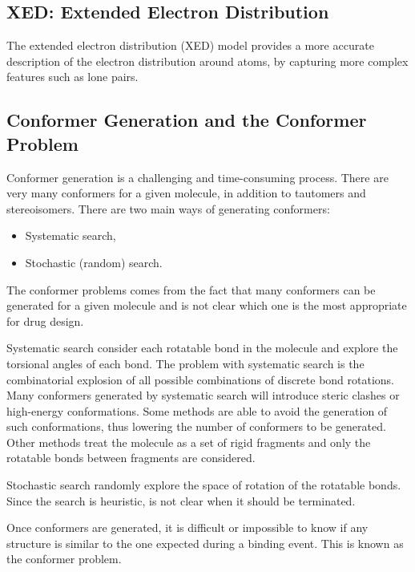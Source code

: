 \subsection{XED: Extended Electron Distribution}

The extended electron distribution (XED) model provides a more accurate description of the electron distribution around atoms, by capturing more complex features such as lone pairs.


\subsection{Conformer Generation and the Conformer Problem}

Conformer generation is a challenging and time-consuming process. 
There are very many conformers for a given molecule, in addition to tautomers and stereoisomers.
There are two main ways of generating conformers:
\begin{itemize}
    \item Systematic search,
    \item Stochastic (random) search.
\end{itemize}

The conformer problems comes from the fact that many conformers can be generated for a given molecule and is not clear which one is the most appropriate for drug design.

Systematic search consider each rotatable bond in the molecule and explore the torsional angles of each bond.
The problem with systematic search is the combinatorial explosion of all possible combinations of discrete bond rotations.
Many conformers generated by systematic search will introduce steric clashes or high-energy conformations.
Some methods are able to avoid the generation of such conformations, thus lowering the number of conformers to be generated. Other methods treat the molecule as a set of rigid fragments and only the rotatable bonds between fragments are considered.

Stochastic search randomly explore the space of rotation of the rotatable bonds. 
Since the search is heuristic, is not clear when it should be terminated.

Once conformers are generated, it is difficult or impossible to know if any structure is similar to the one expected during a binding event. This is known as the conformer problem.